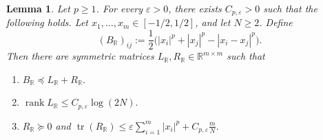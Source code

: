 \documentclass[11pt]{article}
\newtheorem{lemma}[theorem]{Lemma}
\theoremstyle{definition}
\newcommand{\R}{\mathbb R}
\begin{document}
\begin{lemma}\label{lem:real-line-part-ple2}
Let \(p\ge1\). For every \(\varepsilon>0\), there exists
\(C_{p,\varepsilon}>0\) such that the following holds. Let
\(x_1,\dots,x_m\in[-1/2,1/2]\), and let \(N\ge2\). Define
\[
(B_{\R})_{ij}
:=
\frac12\bigl(|x_i|^p+|x_j|^p-|x_i-x_j|^p\bigr).
\]
Then there are symmetric matrices \(L_{\R},R_{\R}\in\R^{m\times m}\) such that
\begin{enumerate}
\item[\textup{(1)}]
\(
B_{\R}\preceq L_{\R}+R_{\R}.
\)

\item[\textup{(2)}]
\(
\operatorname{rank}L_{\R}\le C_{p,\varepsilon}\log(2N).
\)

\item[\textup{(3)}]
\(
R_{\R}\succeq0
\)
and
\(
\operatorname{tr}(R_{\R})
\le
\varepsilon\sum_{i=1}^m |x_i|^p
+
C_{p,\varepsilon}\frac{m}{N}.
\)
\end{enumerate}
\end{lemma}
\end{document}
